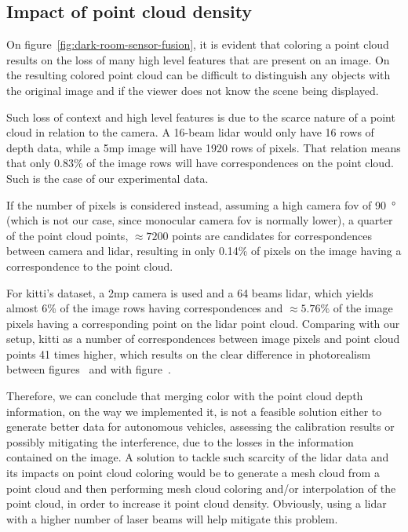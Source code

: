 \subsection{Impact of point cloud density}
On figure~\ref{fig:dark-room-sensor-fusion}, it is evident that coloring a point cloud results on the loss of many high level features that are present on an image. On the resulting colored point cloud can be difficult to distinguish any objects with the original image and if the viewer does not know the scene being displayed.

Such loss of context and high level features is due to the scarce nature of a point cloud in relation to the camera. A 16-beam \ac{lidar} would only have 16 rows of depth data, while a 5\ac{mp} image will have 1920 rows of pixels. That relation means that only 0.83\% of the image rows will have correspondences on the point cloud. Such is the case of our experimental data.

If the number of pixels is considered instead, assuming a high camera \ac{fov} of \SI{90}{\degree} (which is not our case, since monocular camera \ac{fov} is normally lower), a quarter of the point cloud points, $\approx 7200$ points are candidates for correspondences between camera and \ac{lidar}, resulting in only 0.14\% of pixels on the image having a correspondence to the point cloud. 

For \ac{kitti}'s dataset, a 2\ac{mp} camera is used and a 64 beams \ac{lidar}, which yields almost 6\% of the image rows having correspondences and $\approx 5.76\%$ of the image pixels having a corresponding point on the \ac{lidar} point cloud. Comparing with our setup, \ac{kitti} as a number of correspondences between image pixels and point cloud points 41 times higher, which results on the clear difference in photorealism between figures~\cite{fig:cambada-sensor-fusion} and \cite{fig:dark-room-sensor-fusion} with figure~\cite{fig:kitti-sensor-fusion}.

Therefore, we can conclude that merging color with the point cloud depth information, on the way we implemented it, is not a feasible solution either to generate better data for autonomous vehicles, assessing the calibration results or possibly mitigating the interference, due to the losses in the information contained on the image. A solution to tackle such scarcity of the \ac{lidar} data and its impacts on point cloud coloring would be to generate a mesh cloud  from a point cloud and then performing mesh cloud coloring and/or interpolation of the point cloud, in order to increase it point cloud density. Obviously, using a \ac{lidar} with a higher number of laser beams will help mitigate this problem.


